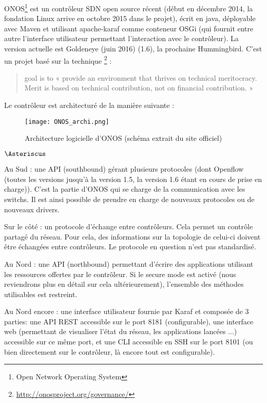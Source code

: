 ONOS\footnote{Open Network Operating System} est un contrôleur SDN open source récent (début en décembre 2014, la fondation Linux arrive en octobre 2015 dans le projet), écrit en java, déployable avec Maven et utilisant apache-karaf comme conteneur OSGi (qui fournit entre autre l’interface utilisateur permettant l’interaction avec le contrôleur).
La version actuelle est Goldeneye (juin 2016) (1.6), la prochaine Hummingbird.
C'est un projet basé sur la technique \footnote{\url{http://onosproject.org/governance/}} : \begin{quote}
goal is to « provide an environment that thrives on technical meritocracy. Merit is based on technical contribution, not on financial contribution. »
\end{quote}

Le contrôleur est architecturé de la manière suivante :
\begin{figure}[h]
  	\centering
  	\texttt{[image: ONOS\_archi.png]}
  	\caption{Architecture logicielle d'ONOS (schéma extrait du site officiel)}
\end{figure}

\begin{list}{$\Asteriscus$}{}

\item Au Sud : une API (southbound) gérant plusieurs protocoles (dont Openflow (toutes les versions jusqu’à la version 1.5, la version 1.6 étant en cours de prise en charge)). C’est la partie d’ONOS qui se charge de la communication avec les switchs. Il est ainsi possible de prendre en charge de nouveaux protocoles ou de nouveaux drivers.

\item Sur le côté : un protocole d’échange entre contrôleurs. Cela permet un contrôle partagé du réseau. Pour cela, des informations sur la topologie de celui-ci doivent être échangées entre contrôleurs. Le protocole en question n'est pas standardisé.

\item Au Nord : une API (northbound) permettant d’écrire des applications utilisant les ressources offertes par le contrôleur. Si le secure mode est activé (nous reviendrons plus en détail sur cela ultérieurement), l’ensemble des méthodes utilisables est restreint. 

\item Au Nord encore : une interface utilisateur fournie par Karaf et composée de 3 parties: une API REST accessible sur le port 8181 (configurable), une interface web (permettant de visualiser l’état du réseau, les applications lancées ...) accessible sur ce même port, et une CLI accessible en SSH sur le port 8101 (ou bien directement sur le contrôleur, là encore tout est configurable).

\end{list}